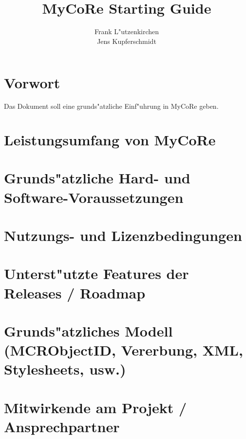 \documentclass[a4paper,12pt]{book}
\begin{document}
\title{MyCoRe Starting Guide}
\author{
    Frank L"utzenkirchen\\
    Jens Kupferschmidt}
\maketitle
\setcounter{secnumdepth}{10}
\chapter*{Vorwort}
Das Dokument soll eine grunds"atzliche Einf"uhrung in MyCoRe geben.

\tableofcontents
\listoffigures
\listoftables
\chapter{Leistungsumfang von MyCoRe}
\chapter{Grunds"atzliche Hard- und Software-Voraussetzungen}
\chapter{Nutzungs- und Lizenzbedingungen}
\chapter{Unterst"utzte Features der Releases / Roadmap}
\chapter{Grunds"atzliches Modell (MCRObjectID, Vererbung, XML, Stylesheets, usw.)}
\chapter{Mitwirkende am Projekt / Ansprechpartner}
\end{document}
